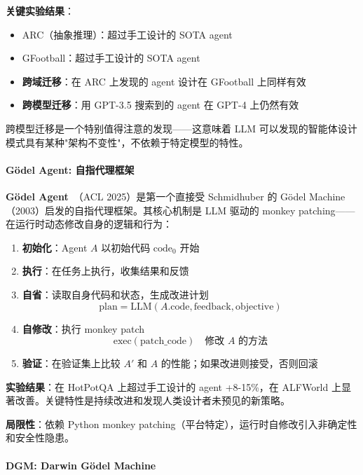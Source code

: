 \textbf{关键实验结果}：
\begin{itemize}
\item ARC（抽象推理）：超过手工设计的 SOTA agent
\item GFootball：超过手工设计的 SOTA agent
\item \textbf{跨域迁移}：在 ARC 上发现的 agent 设计在 GFootball 上同样有效
\item \textbf{跨模型迁移}：用 GPT-3.5 搜索到的 agent 在 GPT-4 上仍然有效
\end{itemize}

跨模型迁移是一个特别值得注意的发现——这意味着 LLM 可以发现的智能体设计模式具有某种"架构不变性"，不依赖于特定模型的特性。

\paragraph{Gödel Agent: 自指代理框架}

\textbf{Gödel Agent}~\citep{godelagent2024}（ACL 2025）是第一个直接受 Schmidhuber 的 Gödel Machine（2003）启发的自指代理框架。其核心机制是 LLM 驱动的 monkey patching——在运行时动态修改自身的逻辑和行为：

\begin{enumerate}
\item \textbf{初始化}：Agent $A$ 以初始代码 $\text{code}_0$ 开始
\item \textbf{执行}：在任务上执行，收集结果和反馈
\item \textbf{自省}：读取自身代码和状态，生成改进计划
\begin{equation}
\text{plan} = \mathrm{LLM}(A.\text{code}, \text{feedback}, \text{objective})
\label{eq:godel-plan}
\end{equation}
\item \textbf{自修改}：执行 monkey patch
\begin{equation}
\text{exec}(\text{patch\_code}) \quad \text{修改 } A \text{ 的方法}
\label{eq:godel-patch}
\end{equation}
\item \textbf{验证}：在验证集上比较 $A'$ 和 $A$ 的性能；如果改进则接受，否则回滚
\end{enumerate}

\textbf{实验结果}：在 HotPotQA 上超过手工设计的 agent +8-15\%，在 ALFWorld 上显著改善。关键特性是持续改进和发现人类设计者未预见的新策略。

\textbf{局限性}：依赖 Python monkey patching（平台特定），运行时自修改引入非确定性和安全性隐患。

\paragraph{DGM: Darwin Gödel Machine}

